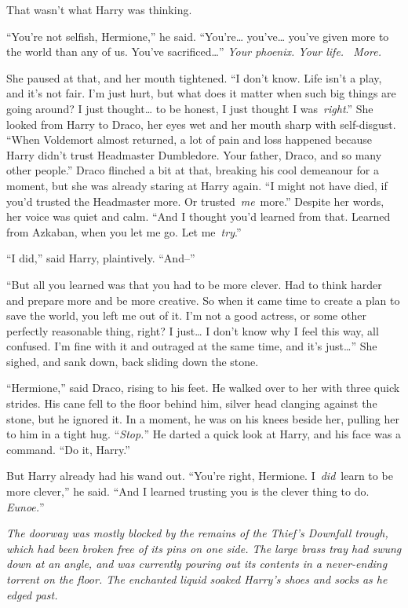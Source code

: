 That wasn't what Harry was thinking.

``You're not selfish, Hermione,'' he said. ``You're\ldots{}
you've\ldots{} you've given more to the world than any of us. You've
sacrificed\ldots{}'' \emph{Your phoenix. Your life. ~More.}

She paused at that, and her mouth tightened. ``I don't know. Life isn't
a play, and it's not fair. I'm just hurt, but what does it matter when
such big things are going around? I just thought\ldots{} to be honest, I
just thought I was~\emph{right}.'' She looked from Harry to Draco, her
eyes wet and her mouth sharp with self-disgust. ``When Voldemort almost
returned, a lot of pain and loss happened because Harry didn't trust
Headmaster Dumbledore. Your father, Draco, and so many other people.''
Draco flinched a bit at that, breaking his cool demeanour for a moment,
but she was already staring at Harry again. ``I might not have died, if
you'd trusted the Headmaster more. Or trusted~\emph{me}~more.'' Despite
her words, her voice was quiet and calm. ``And I thought you'd learned
from that. Learned from Azkaban, when you let me go. Let
me~\emph{try}.''

``I did,'' said Harry, plaintively. ``And--''

``But all you learned was that you had to be more clever. Had to think
harder and prepare more and be more creative. So when it came time to
create a plan to save the world, you left me out of it. I'm not a good
actress, or some other perfectly reasonable thing, right? I just\ldots{}
I don't know why I feel this way, all confused. I'm fine with it and
outraged at the same time, and it's just\ldots{}'' She sighed, and sank
down, back sliding down the stone.

``Hermione,'' said Draco, rising to his feet. He walked over to her with
three quick strides. His cane fell to the floor behind him, silver head
clanging against the stone, but he ignored it. In a moment, he was on
his knees beside her, pulling her to him in a tight hug.
``\emph{Stop.}'' He darted a quick look at Harry, and his face was a
command. ``Do it, Harry.''

But Harry already had his wand out. ``You're right, Hermione.
I~\emph{did}~learn to be more clever,'' he said. ``And I learned
trusting you is the clever thing to do. \emph{Eunoe.}''

\mybreak

\emph{The doorway was mostly blocked by the remains of the Thief's
Downfall trough, which had been broken free of its pins on one side. The
large brass tray had swung down at an angle, and was currently pouring
out its contents in a never-ending torrent on the floor. The enchanted
liquid soaked Harry's shoes and socks as he edged past.}

